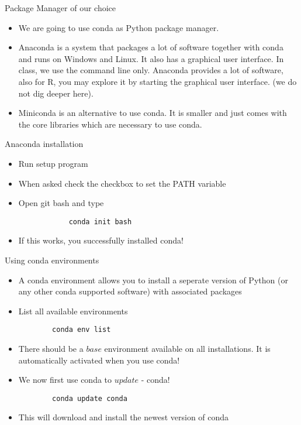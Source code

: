 \begin{frame}{Package Manager of our choice}

	\begin{itemize}
		\item We are going to use conda as Python package manager.
		\item Anaconda is a system that packages a lot of software together with conda and runs on Windows and Linux. It also has a graphical user interface. In class, we use the command line only. Anaconda provides a lot of software, also for R, you may explore it by starting the graphical user interface. (we do not dig deeper here).
		\item Miniconda is an alternative to use conda. It is smaller and just comes with the core libraries which are necessary to use conda.

	\end{itemize}


\end{frame}

\begin{frame}[fragile]{Anaconda installation}

		\begin{itemize}
		\item Run setup program
		\item When asked check the checkbox to set the PATH variable
		\item Open git bash and type

		\begin{verbatim}
			conda init bash
		\end{verbatim}
		\item If this works, you successfully installed conda!

		\end{itemize}

\end{frame}

\begin{frame}[fragile]{Using conda environments}

	\begin{itemize}
		\item A conda environment allows you to install a seperate version of Python (or any other conda supported software) with associated packages

		\item List all available environments
		\begin{verbatim}
		conda env list
		\end{verbatim}

		\item There should be a $base$ environment available on all installations. It is automatically activated when you use conda!
		\item We now first use conda to $update$ - conda!
		\begin{verbatim}
		conda update conda
		\end{verbatim}
		\item This will download and install the newest version of conda

	\end{itemize}

\end{frame}

